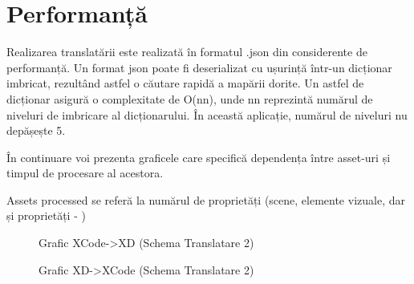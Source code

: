 \section{Performanță}

Realizarea translatării este realizată în formatul .json din considerente de performanță. Un format json poate fi deserializat cu ușurință într-un dicționar imbricat, rezultând astfel o căutare rapidă a mapării dorite. Un astfel de dicționar asigură o complexitate de O(nn), unde nn reprezintă numărul de niveluri de imbricare al dicționarului. În această aplicație, numărul de niveluri nu depășește 5.  

În continuare voi prezenta graficele care specifică dependența între asset-uri și timpul de procesare al acestora.

Assets processed se referă la numărul de proprietăți (scene, elemente vizuale, dar și proprietăți - )

\begin{figure}[!htbp]
\centering
\caption{Grafic XCode->XD (Schema Translatare 2)} \label{fig:Grafic1}
\end{figure}

\begin{figure}[!htbp]
\centering
{}
\caption{Grafic XD->XCode (Schema Translatare 2)} \label{fig:Grafic1}
\end{figure}

